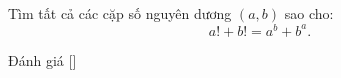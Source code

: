 \ifshowproblem
\begin{problem}\label{problem:MEMO-2015-T-P7}
    Tìm tất cả các cặp số nguyên dương \( (a, b) \) sao cho:
    \[
        a! + b! = a^b + b^a.
    \]
\end{problem}
\fi

\ifshowinfo
Đánh giá [\textbf{}]
\fi